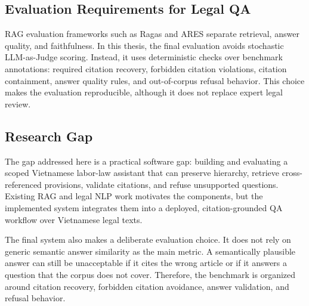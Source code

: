 \subsection{Evaluation Requirements for Legal QA}
RAG evaluation frameworks such as Ragas \cite{es2023ragas} and ARES \cite{saadfalcon2023ares} separate retrieval, answer quality, and faithfulness. In this thesis, the final evaluation avoids stochastic LLM-as-Judge scoring. Instead, it uses deterministic checks over benchmark annotations: required citation recovery, forbidden citation violations, citation containment, answer quality rules, and out-of-corpus refusal behavior. This choice makes the evaluation reproducible, although it does not replace expert legal review.

\subsection{Research Gap}
The gap addressed here is a practical software gap: building and evaluating a scoped Vietnamese labor-law assistant that can preserve hierarchy, retrieve cross-referenced provisions, validate citations, and refuse unsupported questions. Existing RAG and legal NLP work motivates the components, but the implemented system integrates them into a deployed, citation-grounded QA workflow over Vietnamese legal texts.

The final system also makes a deliberate evaluation choice. It does not rely on generic semantic answer similarity as the main metric. A semantically plausible answer can still be unacceptable if it cites the wrong article or if it answers a question that the corpus does not cover. Therefore, the benchmark is organized around citation recovery, forbidden citation avoidance, answer validation, and refusal behavior.

